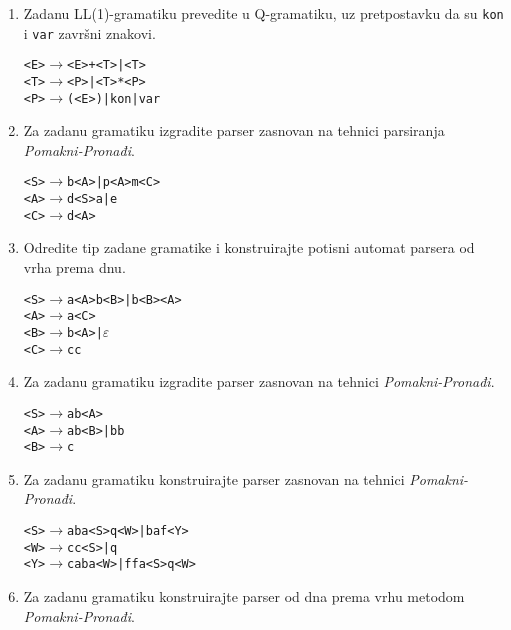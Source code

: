 \documentclass[times, 12pt, utf8]{book}
\begin{document}
\begin{enumerate}[resume]
\item 
Zadanu LL(1)-gramatiku prevedite u Q-gramatiku, uz pretpostavku da su \texttt{kon} i \texttt{var} završni znakovi. \cite[str.~91-98]{udzbenik}

\begin{alltt}
<E> \(\to\) <E>+<T> | <T>
<T> \(\to\) <P> | <T>*<P>
<P> \(\to\) (<E>) | kon | var
\end{alltt} 

\item
Za zadanu gramatiku izgradite parser zasnovan na tehnici parsiranja \emph{Pomakni-Pronađi}. \cite[str.~121-123]{udzbenik}

\begin{alltt}
<S> \(\to\) b<A> | p<A>m<C>
<A> \(\to\) d<S>a | e
<C> \(\to\) d<A>
\end{alltt} 

\item
Odredite tip zadane gramatike i konstruirajte potisni automat parsera od vrha prema dnu.  \cite[str.~84-100]{udzbenik}

\begin{alltt}
<S> \(\to\) a<A>b<B> | b<B><A>
<A> \(\to\) a<C>
<B> \(\to\) b<A> | \(\varepsilon\)
<C> \(\to\) cc
\end{alltt}

\item
Za zadanu gramatiku izgradite parser zasnovan na tehnici \emph{Pomakni-Pronađi}. \cite[str.~121-123]{udzbenik} \cite{auditorne}

\begin{alltt}
<S> \(\to\) ab<A>
<A> \(\to\) ab<B> | bb
<B> \(\to\) c
\end{alltt} 

\item
Za zadanu gramatiku konstruirajte parser zasnovan na tehnici \emph{Pomakni-Pronađi}. \cite[str.~121-123]{udzbenik} \cite{auditorne}

\begin{alltt}
<S> \(\to\) aba<S>q<W> | baf<Y>
<W> \(\to\) cc<S> | q
<Y> \(\to\) caba<W> | ffa<S>q<W>
\end{alltt} 

\item 
Za zadanu gramatiku konstruirajte parser od dna prema vrhu metodom \emph{Pomakni-Pronađi}. \cite[str.~121-123]{udzbenik} \cite{auditorne}


\end{enumerate}
\end{document}
